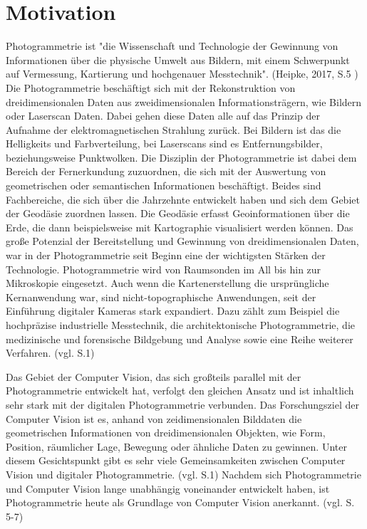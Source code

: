 \chapter{Motivation}

Photogrammetrie ist "die Wissenschaft und Technologie der Gewinnung von Informationen
über die physische Umwelt aus Bildern, mit einem Schwerpunkt auf Vermessung,
Kartierung und hochgenauer Messtechnik". (Heipke, 2017, S.5 \cite{photo})  Die Photogrammetrie beschäftigt sich  mit der Rekonstruktion von dreidimensionalen Daten aus zweidimensionalen Informationsträgern, wie Bildern oder Laserscan Daten. Dabei gehen diese Daten alle auf das Prinzip der Aufnahme der elektromagnetischen Strahlung zurück. Bei Bildern ist das die Helligkeits und Farbverteilung, bei Laserscans sind es Entfernungsbilder, beziehungsweise Punktwolken. Die Disziplin der Photogrammetrie ist dabei dem Bereich der Fernerkundung zuzuordnen, die sich mit der Auswertung von geometrischen oder semantischen Informationen beschäftigt. Beides sind Fachbereiche, die sich über die Jahrzehnte entwickelt haben und sich dem Gebiet der Geodäsie zuordnen lassen. Die Geodäsie erfasst Geoinformationen über die Erde, die dann beispielsweise mit Kartographie visualisiert werden können. Das große Potenzial der Bereitstellung und Gewinnung von dreidimensionalen Daten, war in der Photogrammetrie seit Beginn eine der wichtigsten Stärken der Technologie. Photogrammetrie wird von Raumsonden im All bis hin zur Mikroskopie eingesetzt. Auch wenn die Kartenerstellung die ursprüngliche Kernanwendung war, sind nicht-topographische Anwendungen, seit der Einführung digitaler Kameras stark expandiert. Dazu zählt zum Beispiel die hochpräzise industrielle Messtechnik, die architektonische Photogrammetrie, die medizinische und forensische Bildgebung und Analyse sowie eine Reihe weiterer Verfahren. (vgl. \cite{state_of_art} S.1)


Das Gebiet der Computer Vision, das sich großteils parallel mit der Photogrammetrie entwickelt hat, verfolgt den gleichen Ansatz und ist inhaltlich sehr stark mit der digitalen Photogrammetrie verbunden. Das Forschungsziel der Computer Vision ist es, anhand von zeidimensionalen Bilddaten die geometrischen Informationen von dreidimensionalen Objekten, wie Form, Position, räumlicher Lage, Bewegung oder ähnliche Daten zu gewinnen. Unter diesem Gesichtspunkt gibt es sehr viele Gemeinsamkeiten zwischen Computer Vision und digitaler Photogrammetrie. (vgl. \cite{pose_est_epi} S.1) Nachdem sich Photogrammetrie und Computer Vision lange unabhängig voneinander entwickelt haben, ist Photogrammetrie heute als Grundlage von Computer Vision anerkannt. (vgl. \cite{photo} S. 5-7)

